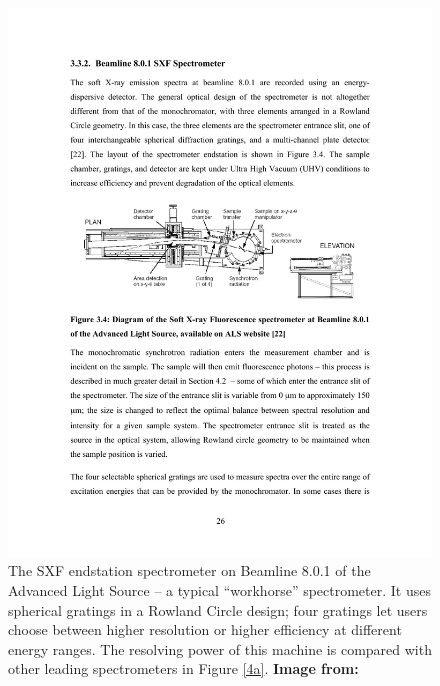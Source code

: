 \begin{figure}[htbp] %
   \centering
   \includegraphics[scale=1.2]{../data/Chapter1/1d_spectrometerExample/1d_bl801SXF_2.pdf} 
   \caption[The SXF endstation spectrometer on Beamline 8.0.1 of the Advanced Light Source.]{The SXF endstation spectrometer on Beamline 8.0.1 of the Advanced Light Source -- a typical ``workhorse'' spectrometer.  It uses spherical gratings in a Rowland Circle design; four gratings let users choose between higher resolution or higher efficiency at different energy ranges. The resolving power of this machine is compared with other leading spectrometers in Figure \ref{4a}.  \textbf{Image from:} \cite{Jia95}
   }
   \label{1d}
\end{figure}

